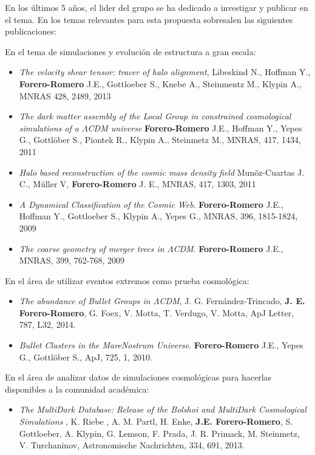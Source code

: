 En los \'ultimos 5 a\~nos, el lider del grupo se ha dedicado a
investigar y publicar en el tema. En los temas relevantes para esta
propuesta sobresalen las siguientes publicaciones:

\noindent
En el tema de simulaciones y evoluci\'on de estructura a gran escala:


\begin{itemize}

\item{\it The velocity shear tensor: tracer of halo alignment},
  Libeskind N., Hoffman Y., {\bf Forero-Romero} J.E., Gottloeber S.,
  Knebe A., Steinmentz M., Klypin A., MNRAS 428, 2489, 2013 

\item
{\it The dark matter assembly of the Local Group in constrained cosmological
  simulations of a $\Lambda$CDM universe} {\bf Forero-Romero} J.E., Hoffman Y., Yepes G., Gottl\"ober S.,
  Piontek R., Klypin A., Steinmetz M., 
MNRAS, 417, 1434, 2011

\item
{\it Halo based reconstruction of the cosmic mass density field}
Mun\~oz-Cuartas J. C., M\"uller V, {\bf Forero-Romero} J. E., MNRAS,
417, 1303, 2011  

\item
{\it A Dynamical Classification of the  Cosmic Web}.  {\bf
  Forero-Romero} J.E., Hoffman Y.,  Gottloeber S., Klypin A., Yepes G., MNRAS, 396, 1815-1824, 2009 

\item 
{\it The coarse geometry of merger trees in
  $\Lambda$CDM}.  {\bf Forero-Romero} J.E., 
MNRAS, 399, 762-768, 2009

\end{itemize}

\noindent
En el \'area de utilizar eventos extremos como prueba cosmol\'ogica:

\begin{itemize}
\item{\it The abundance of Bullet Groups in $\Lambda$CDM},
  J. G. Fern\'andez-Trincado, {\bf J. E. Forero-Romero}, G. Foex,
  V. Motta, T. Verdugo, V. Motta, ApJ Letter, 787, L32, 2014.
\item
{\it Bullet Clusters in the MareNostrum Universe}. 
{\bf Forero-Romero} J.E., Yepes G., Gottl\"ober S., 
ApJ, 725, 1, 2010.
\end{itemize}


\noindent 
En el \'area de analizar datos de simulaciones cosmol\'ogicas
para hacerlas disponibles a la comunidad acad\'emica:

\begin{itemize}
\item{\it The MultiDark Database: Release of the Bolshoi and
  MultiDark Cosmological Simulations} , K. Riebe , A. M. Partl,
  H. Enke, {\bf J.E. Forero-Romero}, S. Gottloeber, A. Klypin,
  G. Lemson, F. Prada, J. R. Primack, M. Steinmetz, V. Turchaninov,
  Astronomische Nachrichten, 334, 691, 2013. 
\end{itemize}

